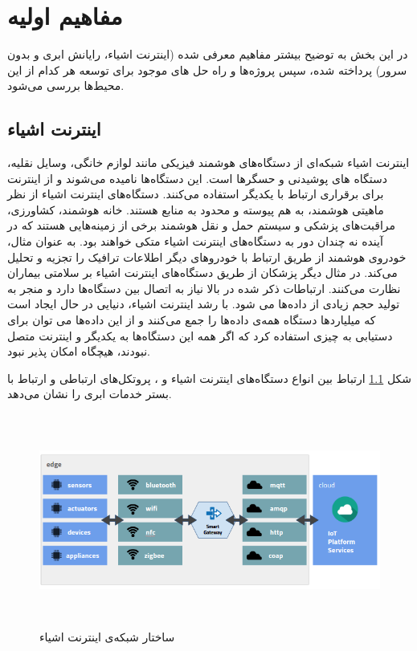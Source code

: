 \chapter{مفاهیم اولیه‌}\label{chapter2}

در این بخش به توضیح بیشتر مفاهیم معرفی شده (اینترنت اشیاء، رایانش ابری و بدون سرور) پرداخته شده، سپس پروژه‌ها و راه حل های موجود برای توسعه هر کدام از این محیط‌ها بررسی می‌شود.

\section{اینترنت اشیاء}

اینترنت اشیاء شبکه‌ای از دستگاه‌های هوشمند فیزیکی مانند لوازم خانگی، وسایل نقلیه، دستگاه های پوشیدنی و حسگرها است. این دستگاه‌ها  نامیده می‌شوند و از اینترنت برای برقراری ارتباط با یکدیگر استفاده می‌کنند. دستگاه‌های اینترنت اشیاء از نظر ماهیتی هوشمند، به هم پیوسته و محدود به منابع هستند. خانه هوشمند‌، کشاورزی‌، مراقبت‌های پزشکی‌ و سیستم حمل و نقل هوشمند برخی از زمینه‌هایی هستند که در آینده‌ نه چندان دور به دستگاه‌های اینترنت اشیاء متکی خواهند بود. به عنوان مثال، خودرو‌ی هوشمند از طریق ارتباط با خودروهای دیگر اطلاعات ترافیک را تجزیه و تحلیل می‌کند. در مثال دیگر پزشکان از طریق دستگاه‌های اینترنت اشیاء بر سلامتی بیماران نظارت می‌کنند. ارتباطات ذکر شده در بالا نیاز به اتصال بین دستگاه‌ها دارد و منجر به تولید حجم زیادی از داده‌ها می شود. با رشد اینترنت اشیاء، دنیایی در حال ایجاد است که میلیاردها دستگاه همه‌ی داده‌ها را جمع می‌کنند و از این داده‌ها می توان برای دستیابی به چیزی استفاده کرد که اگر همه این دستگاه‌ها به یکدیگر و اینترنت متصل نبودند، هیچگاه امکان پذیر نبود.

شکل \ref{IoT_explained} ارتباط بین انواع دستگاه‌های اینترنت اشیاء و ، پروتکل‌های ارتباطی و ارتباط با بستر خدمات ابری را نشان می‌دهد. 

\begin{figure}[!h]
	\centering
	\includegraphics[height=7cm]{images/IoT_explained}
	\caption{ساختار شبکه‌ی اینترنت اشیاء}
	\label{IoT_explained}
\end{figure}

